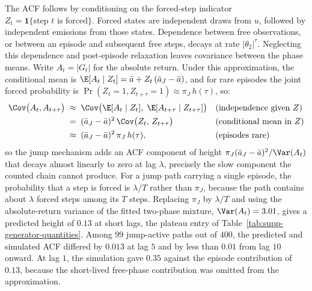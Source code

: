 The ACF follows by conditioning on the
forced-step indicator $Z_t = \mathbf{1}\{\text{step $t$ is forced}\}$.
Forced states are independent draws from $u$, followed by independent emissions from those states. Dependence between free observations, or between an episode and subsequent free steps, decays at rate $|\theta_2|^\tau$. Neglecting this dependence and post-episode relaxation leaves covariance between the phase means. Write
$A_t = |G_t|$ for the absolute return. Under this approximation, the conditional mean is
$\E[A_t \mid Z_t] = \bar a + Z_t\, (\bar a_J - \bar a)$,
and for rare episodes the joint forced probability is
$\Pr(Z_t = 1, Z_{t+\tau} = 1) \approx \pi_J\, h(\tau)$, so:
\begin{align}
  \Cov\big(A_t, A_{t+\tau}\big)
   &\;\approx\;
     \Cov\big(\E[A_t \mid Z_t],\;
              \E[A_{t+\tau} \mid Z_{t+\tau}]\big)
     && \text{(independence given $Z$)} \notag \\
   &\;=\; (\bar a_J - \bar a)^2\,
     \Cov\big(Z_t,\, Z_{t+\tau}\big)
     && \text{(conditional mean in $Z$)} \notag \\
   &\;\approx\; (\bar a_J - \bar a)^2\, \pi_J\, h(\tau),
     && \text{(episodes rare)}
  \label{eq:supp-acf-wj}
\end{align}
so the jump mechanism adds an ACF component of height $\pi_J (\bar a_J
- \bar a)^2 / \Var(A_t)$ that decays almost linearly to zero at lag
$\lambda$, precisely the slow component the counted chain cannot
produce. For a jump path carrying a single episode, the probability
that a step is forced is $\lambda / T$ rather than $\pi_J$, because
the path contains about $\lambda$ forced steps among its $T$ steps.
Replacing $\pi_J$ by $\lambda / T$ and using the absolute-return
variance of the fitted two-phase mixture, $\Var(A_t) = 3.01$, gives a predicted height
of $0.13$ at short lags, the plateau entry of
Table~\ref{tab:supp-generator-quantities}.
Among $99$ jump-active paths out of $400$, the predicted and simulated ACF differed by $0.013$ at lag $5$ and by less than $0.01$ from lag $10$ onward. At lag $1$, the simulation gave $0.35$ against the episode contribution of $0.13$, because the short-lived free-phase contribution was omitted from the approximation.

